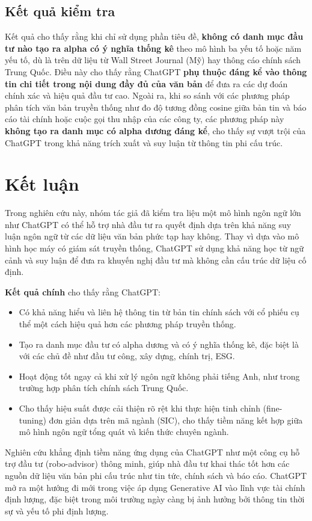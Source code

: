 \documentclass[a4paper,12pt]{article}
\begin{document}
\subsection{Kết quả kiểm tra}

Kết quả cho thấy rằng khi chỉ sử dụng phần tiêu đề, \textbf{không có danh mục đầu tư nào tạo ra alpha có ý nghĩa thống kê} theo mô hình ba yếu tố hoặc năm yếu tố, dù là trên dữ liệu từ Wall Street Journal (Mỹ) hay thông cáo chính sách Trung Quốc. Điều này cho thấy rằng ChatGPT \textbf{phụ thuộc đáng kể vào thông tin chi tiết trong nội dung đầy đủ của văn bản} để đưa ra các dự đoán chính xác và hiệu quả đầu tư cao.
\noindent
Ngoài ra, khi so sánh với các phương pháp phân tích văn bản truyền thống như đo độ tương đồng cosine giữa bản tin và báo cáo tài chính hoặc cuộc gọi thu nhập của các công ty, các phương pháp này \textbf{không tạo ra danh mục có alpha dương đáng kể}, cho thấy sự vượt trội của ChatGPT trong khả năng trích xuất và suy luận từ thông tin phi cấu trúc.

\section{Kết luận}

Trong nghiên cứu này, nhóm tác giả đã kiểm tra liệu một mô hình ngôn ngữ lớn như ChatGPT có thể hỗ trợ nhà đầu tư ra quyết định dựa trên khả năng suy luận ngôn ngữ từ các dữ liệu văn bản phức tạp hay không. Thay vì dựa vào mô hình học máy có giám sát truyền thống, ChatGPT sử dụng khả năng học từ ngữ cảnh và suy luận để đưa ra khuyến nghị đầu tư mà không cần cấu trúc dữ liệu cố định.

\textbf{Kết quả chính} cho thấy rằng ChatGPT:
\begin{itemize}
    \item Có khả năng hiểu và liên hệ thông tin từ bản tin chính sách với cổ phiếu cụ thể một cách hiệu quả hơn các phương pháp truyền thống.
    \item Tạo ra danh mục đầu tư có alpha dương và có ý nghĩa thống kê, đặc biệt là với các chủ đề như đầu tư công, xây dựng, chính trị, ESG.
    \item Hoạt động tốt ngay cả khi xử lý ngôn ngữ không phải tiếng Anh, như trong trường hợp phân tích chính sách Trung Quốc.
    \item Cho thấy hiệu suất được cải thiện rõ rệt khi thực hiện tinh chỉnh (fine-tuning) đơn giản dựa trên mã ngành (SIC), cho thấy tiềm năng kết hợp giữa mô hình ngôn ngữ tổng quát và kiến thức chuyên ngành.
\end{itemize}
\noindent
Nghiên cứu khẳng định tiềm năng ứng dụng của ChatGPT như một công cụ hỗ trợ đầu tư (robo-advisor) thông minh, giúp nhà đầu tư khai thác tốt hơn các nguồn dữ liệu văn bản phi cấu trúc như tin tức, chính sách và báo cáo. ChatGPT mở ra một hướng đi mới trong việc áp dụng Generative AI vào lĩnh vực tài chính định lượng, đặc biệt trong môi trường ngày càng bị ảnh hưởng bởi thông tin thời sự và yếu tố phi định lượng.
\end{document}
